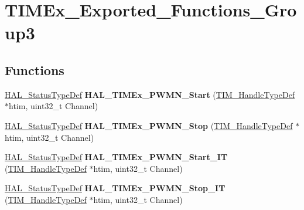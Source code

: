 \hypertarget{group___t_i_m_ex___exported___functions___group3}{}\section{T\+I\+M\+Ex\+\_\+\+Exported\+\_\+\+Functions\+\_\+\+Group3}
\label{group___t_i_m_ex___exported___functions___group3}
\subsection*{Functions}
\begin{DoxyCompactItemize}
\item 
\mbox{\label{group___t_i_m_ex___exported___functions___group3_ga4f2b0bb4b66a5acd76eac4e8d32cc498}} 
\hyperlink{stm32f0xx__hal__def_8h_a63c0679d1cb8b8c684fbb0632743478f}{H\+A\+L\+\_\+\+Status\+Type\+Def} {\bfseries H\+A\+L\+\_\+\+T\+I\+M\+Ex\+\_\+\+P\+W\+M\+N\+\_\+\+Start} (\hyperlink{struct_t_i_m___handle_type_def}{T\+I\+M\+\_\+\+Handle\+Type\+Def} $\ast$htim, uint32\+\_\+t Channel)
\item 
\mbox{\label{group___t_i_m_ex___exported___functions___group3_ga0f2e27f3fb6d8f42d998e2071e5f0482}} 
\hyperlink{stm32f0xx__hal__def_8h_a63c0679d1cb8b8c684fbb0632743478f}{H\+A\+L\+\_\+\+Status\+Type\+Def} {\bfseries H\+A\+L\+\_\+\+T\+I\+M\+Ex\+\_\+\+P\+W\+M\+N\+\_\+\+Stop} (\hyperlink{struct_t_i_m___handle_type_def}{T\+I\+M\+\_\+\+Handle\+Type\+Def} $\ast$htim, uint32\+\_\+t Channel)
\item 
\mbox{\label{group___t_i_m_ex___exported___functions___group3_ga82f0b53f6b10e6aafc6835178662c488}} 
\hyperlink{stm32f0xx__hal__def_8h_a63c0679d1cb8b8c684fbb0632743478f}{H\+A\+L\+\_\+\+Status\+Type\+Def} {\bfseries H\+A\+L\+\_\+\+T\+I\+M\+Ex\+\_\+\+P\+W\+M\+N\+\_\+\+Start\+\_\+\+IT} (\hyperlink{struct_t_i_m___handle_type_def}{T\+I\+M\+\_\+\+Handle\+Type\+Def} $\ast$htim, uint32\+\_\+t Channel)
\item 
\mbox{\label{group___t_i_m_ex___exported___functions___group3_ga13848e20df29fa552ef4f5b69fef20a6}} 
\hyperlink{stm32f0xx__hal__def_8h_a63c0679d1cb8b8c684fbb0632743478f}{H\+A\+L\+\_\+\+Status\+Type\+Def} {\bfseries H\+A\+L\+\_\+\+T\+I\+M\+Ex\+\_\+\+P\+W\+M\+N\+\_\+\+Stop\+\_\+\+IT} (\hyperlink{struct_t_i_m___handle_type_def}{T\+I\+M\+\_\+\+Handle\+Type\+Def} $\ast$htim, uint32\+\_\+t Channel)

\end{DoxyCompactItemize}
